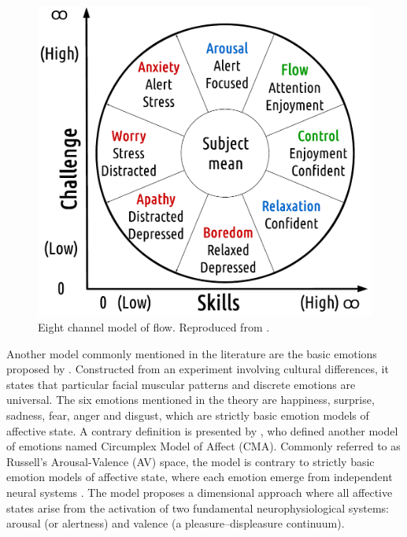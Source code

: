 \begin{figure}[h!]
    \centering
    \includegraphics[scale=0.3]{Content/figures/flow-eight.png}
    \caption{Eight channel model of flow. Reproduced from \textcite{nakamura2014concept}.}
    \label{fig:flow-eight}
\end{figure}

Another model commonly mentioned in the literature are the basic emotions proposed by \textcite{ekman1971constants}. Constructed from an experiment involving cultural differences, it states that particular facial muscular patterns and discrete emotions are universal. The six emotions mentioned in the theory are happiness, surprise, sadness, fear, anger and disgust, which are strictly basic emotion models of affective state. A contrary definition is presented by \textcite{russell1978evidence}, who defined another model of emotions named Circumplex Model of Affect (CMA). Commonly referred to as Russell's Arousal-Valence (AV) space, the model is contrary to strictly basic emotion models of affective state, where each emotion emerge from independent neural systems \parencite{posner2005circumplex}. The model proposes a dimensional approach where all affective states arise from the activation of two fundamental neurophysiological systems: arousal (or alertness) and valence (a pleasure–displeasure continuum).

